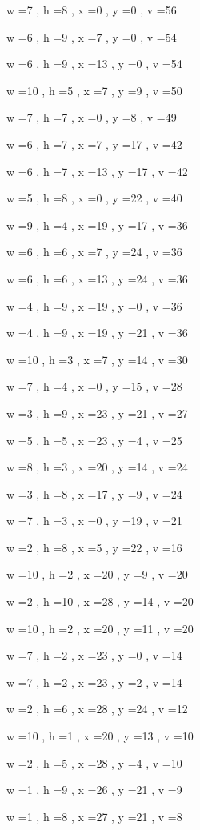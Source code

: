\documentclass[11pt]{article}
\begin{document}
w =7 , h =8 , x =0 , y =0 , v =56
\par
w =6 , h =9 , x =7 , y =0 , v =54
\par
w =6 , h =9 , x =13 , y =0 , v =54
\par
w =10 , h =5 , x =7 , y =9 , v =50
\par
w =7 , h =7 , x =0 , y =8 , v =49
\par
w =6 , h =7 , x =7 , y =17 , v =42
\par
w =6 , h =7 , x =13 , y =17 , v =42
\par
w =5 , h =8 , x =0 , y =22 , v =40
\par
w =9 , h =4 , x =19 , y =17 , v =36
\par
w =6 , h =6 , x =7 , y =24 , v =36
\par
w =6 , h =6 , x =13 , y =24 , v =36
\par
w =4 , h =9 , x =19 , y =0 , v =36
\par
w =4 , h =9 , x =19 , y =21 , v =36
\par
w =10 , h =3 , x =7 , y =14 , v =30
\par
w =7 , h =4 , x =0 , y =15 , v =28
\par
w =3 , h =9 , x =23 , y =21 , v =27
\par
w =5 , h =5 , x =23 , y =4 , v =25
\par
w =8 , h =3 , x =20 , y =14 , v =24
\par
w =3 , h =8 , x =17 , y =9 , v =24
\par
w =7 , h =3 , x =0 , y =19 , v =21
\par
w =2 , h =8 , x =5 , y =22 , v =16
\par
w =10 , h =2 , x =20 , y =9 , v =20
\par
w =2 , h =10 , x =28 , y =14 , v =20
\par
w =10 , h =2 , x =20 , y =11 , v =20
\par
w =7 , h =2 , x =23 , y =0 , v =14
\par
w =7 , h =2 , x =23 , y =2 , v =14
\par
w =2 , h =6 , x =28 , y =24 , v =12
\par
w =10 , h =1 , x =20 , y =13 , v =10
\par
w =2 , h =5 , x =28 , y =4 , v =10
\par
w =1 , h =9 , x =26 , y =21 , v =9
\par
w =1 , h =8 , x =27 , y =21 , v =8
\par
\newpage
\end{document}

